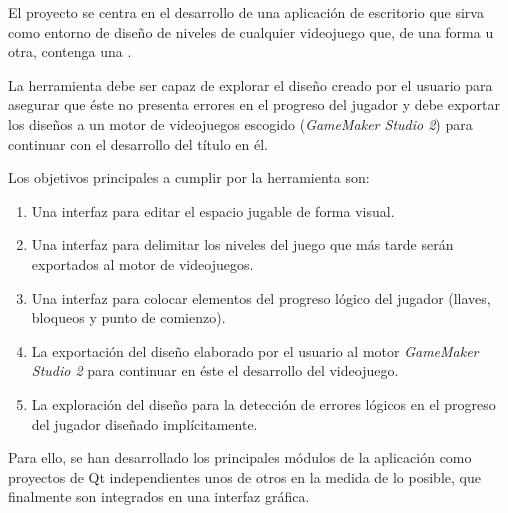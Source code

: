 El proyecto se centra en el desarrollo de una aplicación de escritorio que sirva como entorno de diseño de niveles de cualquier videojuego que, de una forma u otra, contenga una .

La herramienta debe ser capaz de explorar el diseño creado por el usuario para asegurar que éste no presenta errores en el progreso del jugador y debe exportar los diseños a un motor de videojuegos escogido (\textit{GameMaker Studio 2}) para continuar con el desarrollo del título en él.

Los objetivos principales a cumplir por la herramienta son:
\begin{enumerate}
	\item Una interfaz para editar el espacio jugable de forma visual.
	\item Una interfaz para delimitar los niveles del juego que más tarde serán exportados al motor de videojuegos.
	\item Una interfaz para colocar elementos del progreso lógico del jugador (llaves, bloqueos y punto de comienzo).
	\item La exportación del diseño elaborado por el usuario al motor \textit{GameMaker Studio 2} para continuar en éste el desarrollo del videojuego.
	\item La exploración del diseño para la detección de errores lógicos en el progreso del jugador diseñado implícitamente.
\end{enumerate}

Para ello, se han desarrollado los principales módulos de la aplicación como proyectos de Qt\cite{Qt} independientes unos de otros en la medida de lo posible, que finalmente son integrados en una interfaz gráfica.